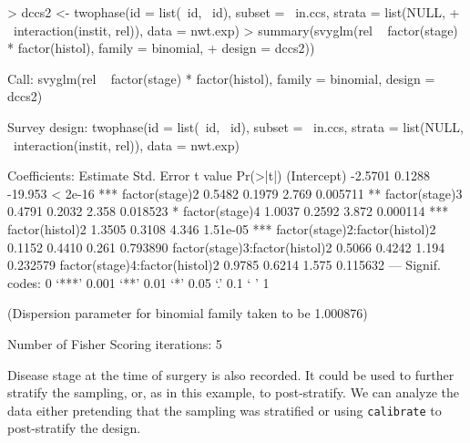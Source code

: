 \documentclass{article}
\begin{document}
\begin{Schunk}
\begin{Sinput}
> dccs2 <- twophase(id = list(~id, ~id), subset = ~in.ccs, strata = list(NULL, 
+     ~interaction(instit, rel)), data = nwt.exp)
> summary(svyglm(rel ~ factor(stage) * factor(histol), family = binomial, 
+     design = dccs2))
\end{Sinput}
\begin{Soutput}
Call:
svyglm(rel ~ factor(stage) * factor(histol), family = binomial, 
    design = dccs2)

Survey design:
twophase(id = list(~id, ~id), subset = ~in.ccs, strata = list(NULL, 
    ~interaction(instit, rel)), data = nwt.exp)

Coefficients:
                               Estimate Std. Error t value Pr(>|t|)    
(Intercept)                     -2.5701     0.1288 -19.953  < 2e-16 ***
factor(stage)2                   0.5482     0.1979   2.769 0.005711 ** 
factor(stage)3                   0.4791     0.2032   2.358 0.018523 *  
factor(stage)4                   1.0037     0.2592   3.872 0.000114 ***
factor(histol)2                  1.3505     0.3108   4.346 1.51e-05 ***
factor(stage)2:factor(histol)2   0.1152     0.4410   0.261 0.793890    
factor(stage)3:factor(histol)2   0.5066     0.4242   1.194 0.232579    
factor(stage)4:factor(histol)2   0.9785     0.6214   1.575 0.115632    
---
Signif. codes:  0 ‘***’ 0.001 ‘**’ 0.01 ‘*’ 0.05 ‘.’ 0.1 ‘ ’ 1 

(Dispersion parameter for binomial family taken to be 1.000876)

Number of Fisher Scoring iterations: 5
\end{Soutput}
\end{Schunk}

Disease stage at the time of surgery is also recorded. It could be
used to further stratify the sampling, or, as in this example, to
post-stratify.  We can analyze the data either pretending that the
sampling was stratified or using \texttt{calibrate} to post-stratify
the design.
\end{document}
